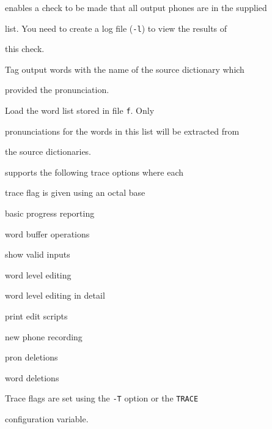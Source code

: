 \begin{optlist}
     enables a check to be made that all output phones are in the supplied


     list. You need to create a log file (\texttt{-l}) to view the results of 


     this check.


    Tag output words with the name of the source dictionary which


    provided the pronunciation.


    Load the word list stored in file \texttt{f}.  Only 


    pronunciations for the words in this list will be extracted from


    the source dictionaries. 


\stdoptQ


\end{optlist}












 supports the following trace options where each


trace flag is given using an octal base


\begin{optlist}


    basic progress reporting 


    word buffer operations 


    show valid inputs 


    word level editing 


    word level editing in detail 


    print edit scripts 


    new phone recording 


    pron deletions 


    word deletions                    


\end{optlist}


Trace flags are set using the \texttt{-T} option or the  \texttt{TRACE} 


configuration variable.


















